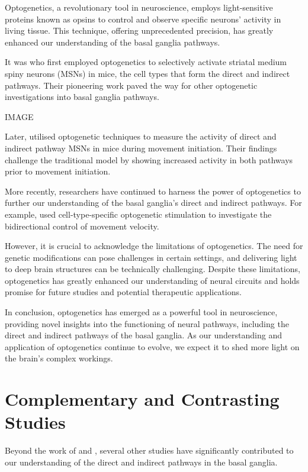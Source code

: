 \documentclass[10pt]{article}
\begin{document}
\begin{sloppypar}
  Optogenetics, a revolutionary tool in neuroscience, employs light-sensitive proteins known as opsins to control and observe specific neurons’ activity in living tissue. This technique, offering unprecedented precision, has greatly enhanced our understanding of the basal ganglia pathways.

  It was \cite{kravitz_regulation_2010} who first employed optogenetics to selectively activate striatal medium spiny neurons (MSNs) in mice, the cell types that form the direct and indirect pathways. Their pioneering work paved the way for other optogenetic investigations into basal ganglia pathways.

  IMAGE

  Later, \cite{cui_concurrent_2013} utilised optogenetic techniques to measure the activity of direct and indirect pathway MSNs in mice during movement initiation. Their findings challenge the traditional model by showing increased activity in both pathways prior to movement initiation.

  More recently, researchers have continued to harness the power of optogenetics to further our understanding of the basal ganglia’s direct and indirect pathways. For example, \cite{yttri_opponent_2016} used cell-type-specific optogenetic stimulation to investigate the bidirectional control of movement velocity.

  However, it is crucial to acknowledge the limitations of optogenetics. The need for genetic modifications can pose challenges in certain settings, and delivering light to deep brain structures can be technically challenging. Despite these limitations, optogenetics has greatly enhanced our understanding of neural circuits and holds promise for future studies and potential therapeutic applications.

  In conclusion, optogenetics has emerged as a powerful tool in neuroscience, providing novel insights into the functioning of neural pathways, including the direct and indirect pathways of the basal ganglia. As our understanding and application of optogenetics continue to evolve, we expect it to shed more light on the brain’s complex workings.

  \section{Complementary and Contrasting Studies}
  \label{sec:complementary-and-contrasting-studies}

  Beyond the work of \cite{cui_concurrent_2013} and \cite{kravitz_regulation_2010}, several other studies have significantly contributed to our understanding of the direct and indirect pathways in the basal ganglia.


\end{sloppypar}
\end{document}
